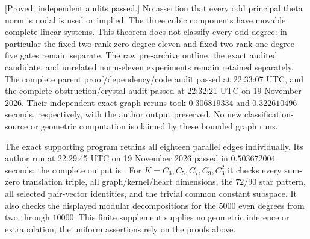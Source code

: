 \begin{remark}[Scope]
\label{rem:nine-theta-transfer-scope-candidate}
\textup{[Proved; independent audits passed.]}
No assertion that every odd principal theta norm is nodal is used
or implied. The three cubic components have movable complete
linear systems. This theorem does not classify every odd degree:
in particular the fixed two-rank-zero degree eleven and fixed
two-rank-one degree five gates remain separate. The raw pre-archive outline, the exact audited candidate, and
unrelated norm-eleven experiments remain retained separately.
The complete parent proof/dependency/code audit passed at
22:33:07 UTC, and the complete obstruction/crystal audit passed
at 22:32:21 UTC on 19 November 2026. Their independent exact
graph reruns took $0.306819334$ and $0.322610496$ seconds,
respectively, with the author output preserved. No new
classification-source or geometric computation is claimed by
these bounded graph runs.

The exact supporting program
retains all eighteen parallel edges individually. Its author run
at 22:29:45 UTC on 19 November 2026 passed in $0.503672004$ seconds;
the complete output is
.
For $K=C_3,C_5,C_7,C_9,C_3^2$ it checks every sum-zero translation
triple, all graph/kernel/heart dimensions, the $72/90$ star pattern,
all selected pair-vector identities, and the trivial common
constant subspace. It also checks the displayed modular
decompositions for the $5000$ even degrees from two through
$10000$. This finite supplement supplies no geometric inference
or extrapolation; the uniform assertions rely on the proofs above.
\end{remark}
